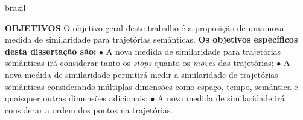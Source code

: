 {\begin{otherlanguage*}{brazil}
\begin{resumo}
        \newline
        \newline
        \textbf{OBJETIVOS}
        \newline
        \newline
        O objetivo geral deste trabalho é a proposição de uma nova medida de similaridade para trajetórias semânticas.
        \newline
        \textbf{Os objetivos específicos desta dissertação são:}
        \newline
        $\bullet$ A nova medida de similaridade para trajetórias semânticas irá considerar tanto os \emph{stops} quanto os \emph{moves} das trajetórias;
        \newline
        $\bullet$ A nova medida de similaridade permitirá medir a similaridade de trajetórias semânticas considerando múltiplas dimensões como espaço, tempo, semântica e quaisquer outras dimensões adicionais;
        \newline
        $\bullet$ A nova medida de similaridade irá considerar a ordem dos pontos na trajetórias.
        \newline
        \newline
        

\end{resumo}
\end{otherlanguage*}}
